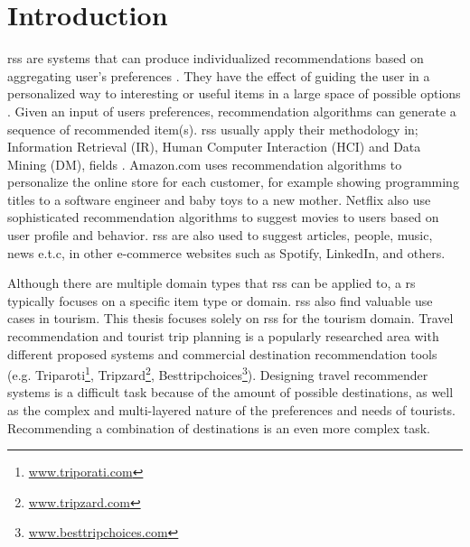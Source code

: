 

\chapter{Introduction}\label{chapter:introduction}
\Glspl{rs} are systems that can produce individualized recommendations based on aggregating user's preferences \parencite{Ricci2011IntroductionHandbook}. They have the effect of guiding the user in a personalized way to interesting
or useful items in a large space of possible options \parencite{Burke2002HybridInteraction}. Given an input of users preferences, recommendation algorithms can generate a sequence of recommended item(s).  \Glspl{rs} usually
apply their methodology in; Information Retrieval (IR), Human Computer Interaction (HCI) and Data Mining (DM), fields \parencite{Ricci2011IntroductionHandbook}. Amazon.com \parencite{Linden2003Amazon.comFiltering} uses recommendation algorithms to personalize the online store for each customer, for example showing programming titles to a software engineer and baby toys to a new mother.  Netflix \parencite{Amatriain2013BigRecommendations} also use sophisticated recommendation algorithms to suggest movies to users based on user profile and behavior. \Glspl{rs} are also used to suggest articles, people, music, news e.t.c, in other e-commerce websites such as Spotify, LinkedIn, and others.

Although there are multiple domain types that \glspl{rs} can be applied to, a \gls{rs} typically focuses on a specific item type or domain. \Glspl{rs} also find valuable use cases in tourism. This thesis focuses solely on \glspl{rs} for the tourism domain. Travel recommendation and tourist trip planning is a popularly researched area with different proposed systems \parencite{wolfgang_umap_recsystem, cbrecsys2014, Thiengburanathum2018AnTourists, Arif2020Blockchain-BasedSystem, Alrasheed2020ASystem} and commercial destination recommendation tools (e.g. Triparoti\footnote{\url{www.triporati.com}}, Tripzard\footnote{\url{www.tripzard.com}}, Besttripchoices\footnote{\url{www.besttripchoices.com}}).
Designing travel recommender systems is a difficult task because of the amount of possible destinations, as well as the complex
and multi-layered nature of the preferences and needs of tourists. Recommending a combination of destinations is an even more complex task. 


